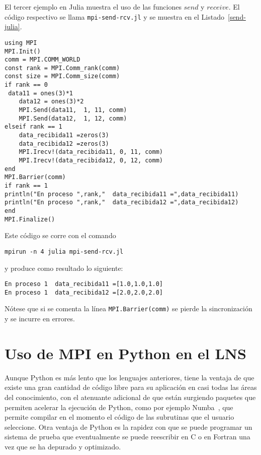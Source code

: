 \documentclass[letter]{jpconf}
\begin{document}
El tercer ejemplo en Julia muestra el uso de las funciones $send$ y $receive$. El c\'odigo respectivo se llama  \texttt{mpi-send-rcv.jl} y se muestra en el Listado~\ref{send-julia}.
\begin{lstlisting}[float,floatplacement=H,label=send-julia,caption=Listado del programa \texttt{mpi-send-rcv.jl} en Julia]
using MPI
MPI.Init()
comm = MPI.COMM_WORLD
const rank = MPI.Comm_rank(comm)
const size = MPI.Comm_size(comm)
if rank == 0
 data11 = ones(3)*1
    data12 = ones(3)*2
    MPI.Send(data11,  1, 11, comm)
    MPI.Send(data12,  1, 12, comm)
elseif rank == 1
    data_recibida11 =zeros(3)
    data_recibida12 =zeros(3)
    MPI.Irecv!(data_recibida11, 0, 11, comm)
    MPI.Irecv!(data_recibida12, 0, 12, comm)  
end
MPI.Barrier(comm)
if rank == 1
println("En proceso ",rank,"  data_recibida11 =",data_recibida11)
println("En proceso ",rank,"  data_recibida12 =",data_recibida12)
end
MPI.Finalize() 
\end{lstlisting}


Este c\'odigo se corre con el comando
\color{blue}
\begin{verbatim}
mpirun -n 4 julia mpi-send-rcv.jl
\end{verbatim}
\color{black}
y produce como resultado lo siguiente:
\color{brown}
\begin{verbatim}
En proceso 1  data_recibida11 =[1.0,1.0,1.0]
En proceso 1  data_recibida12 =[2.0,2.0,2.0]
\end{verbatim}
\color{black}

N\'otese que si se comenta la l\'inea \texttt{MPI.Barrier(comm)} se pierde la sincronizaci\'on y se incurre en errores.


\section{Uso de MPI en Python en el LNS}

Aunque Python es m\'as lento que los lenguajes anteriores, tiene la ventaja de que existe una gran cantidad de c\'odigo libre para su aplicaci\'on en casi todas las \'areas del conocimiento, con el atenuante adicional de que est\'an surgiendo paquetes que permiten acelerar la ejecuci\'on de Python, como por ejemplo Numba~\cite{numba}, que permite compilar en el momento el c\'odigo de las subrutinas que el usuario seleccione. 
Otra ventaja de Python es la rapidez con que se puede programar un sistema de prueba que eventualmente se puede reescribir en C o en Fortran una vez que se ha depurado y optimizado.
\end{document}
